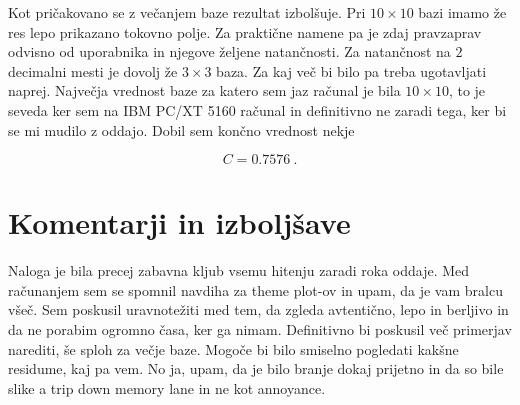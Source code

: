 \documentclass[a4paper]{article}
\begin{document}
Kot pričakovano se z večanjem baze rezultat izbolšuje. Pri $10\times10$ bazi imamo že res lepo prikazano tokovno polje. Za praktične 
namene pa je zdaj pravzaprav odvisno od uporabnika in njegove željene natančnosti. Za natančnost na $2$ decimalni mesti je dovolj
že $3\times3$ baza. Za kaj več bi bilo pa treba ugotavljati naprej. Največja vrednost baze za katero sem jaz računal je bila $10\times10$,
to je seveda ker sem na IBM PC/XT 5160 računal in definitivno ne zaradi tega, ker bi se mi mudilo z oddajo. Dobil sem končno vrednost nekje

\begin{equation}
    C = 0.7576\>.
\end{equation}

\section{Komentarji in izboljšave}
Naloga je bila precej zabavna kljub vsemu hitenju zaradi roka oddaje. Med računanjem sem se spomnil navdiha za theme plot-ov in upam,
da je vam bralcu všeč. Sem poskusil uravnotežiti med tem, da zgleda avtentično, lepo in berljivo in da ne porabim ogromno časa, ker ga nimam.
Definitivno bi poskusil več primerjav narediti, še sploh za večje baze. Mogoče bi bilo smiselno pogledati kakšne residume, kaj pa vem. No ja,
upam, da je bilo branje dokaj prijetno in da so bile slike a trip down memory lane in ne kot annoyance.\\
\end{document}
